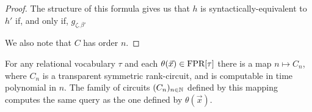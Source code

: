 \documentclass[../paper.tex]{subfiles}
\begin{document}
\begin{proof}
    The structure of this formula gives us that $h$ is syntactically-equivalent
    to $h'$ if, and only if, $g_{\zeta , \beta'}$




    We also note that $C$ has order $n$.


  \end{proof}

\begin{thm}
  For any relational vocabulary $\tau$ and each $\theta(\vec{x}) \in \text{\upshape FPR}[\tau]$
  there is a map $n \mapsto C_n$, where $C_n$ is a transparent symmetric
  rank-circuit, and is computable in time polynomial in $n$. The family of
  circuits $(C_n)_{n \in \mathbb{N}}$ defined by this mapping computes the same query
  as the one defined by $\theta(\vec{x})$.
  \label{thm:translating-formulas-to-circuits}
\end{thm}
\end{document}

